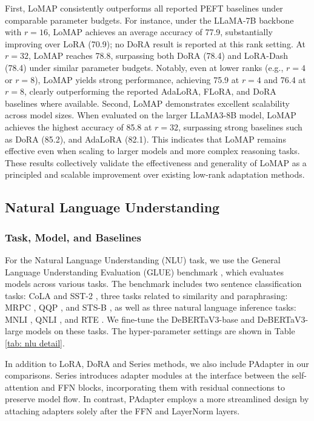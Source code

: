 First, LoMAP consistently outperforms all reported PEFT baselines under comparable parameter budgets.
For instance, under the LLaMA-7B backbone with $r=16$, LoMAP achieves an average accuracy of 77.9, substantially improving over LoRA (70.9); no DoRA result is reported at this rank setting.
At $r=32$, LoMAP reaches 78.8, surpassing both DoRA (78.4) and LoRA-Dash (78.4) under similar parameter budgets.
Notably, even at lower ranks (e.g., $r=4$ or $r=8$), LoMAP yields strong performance, achieving 75.9 at $r=4$ and 76.4 at $r=8$, clearly outperforming the reported AdaLoRA, FLoRA, and DoRA baselines where available.
Second, LoMAP demonstrates excellent scalability across model sizes. 
When evaluated on the larger LLaMA3-8B model, LoMAP achieves the highest accuracy of 85.8 at $r=32$, surpassing strong baselines such as DoRA (85.2), and AdaLoRA (82.1). 
This indicates that LoMAP remains effective even when scaling to larger models and more complex reasoning tasks.
These results collectively validate the effectiveness and generality of LoMAP as a principled and scalable improvement over existing low-rank adaptation methods.



\subsection{Natural Language Understanding}


\subsubsection{Task, Model, and Baselines}

For the Natural Language Understanding (NLU) task, we use the General Language Understanding Evaluation (GLUE) benchmark \cite{wang2018glue}, which evaluates models across various tasks. 
The benchmark includes two sentence classification tasks: CoLA \cite{warstadt2019neural} and SST-2 \cite{socher2013recursive}, three tasks related to similarity and paraphrasing: MRPC \cite{dolan2005automatically}, QQP \cite{wang2018glue}, and STS-B \cite{cer2017semeval}, as well as three natural language inference tasks: MNLI \cite{williams2017broad}, QNLI \cite{rajpurkar2016squad}, and RTE \cite{dagan2005pascal,bar2006second,giampiccolo2007third,bentivogli2009fifth}. 
We fine-tune the DeBERTaV3-base and DeBERTaV3-large \cite{he2021debertav3} models on these tasks. 
The hyper-parameter settings are shown in Table \ref{tab: nlu detail}.


In addition to LoRA, DoRA and Series methods, we also include PAdapter in our comparisons.
Series introduces adapter modules at the interface between the self-attention and FFN blocks, incorporating them with residual connections to preserve model flow. In contrast, PAdapter employs a more streamlined design by attaching adapters solely after the FFN and LayerNorm layers.





